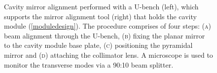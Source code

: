 \documentclass[../Thesis-IJspeert.tex]{subfiles}
\begin{document}
\begin{figure}[t]
\caption[Cavity mirror alignment procedure.]{Cavity mirror alignment performed with a U-bench (left), which supports the mirror alignment tool (right) that holds the cavity module (\autoref{moduledesign}). The procedure comprises of four steps: (\textsc{a}) beam alignment through the U-bench, (\textsc{b}) fixing the planar mirror to the cavity module base plate, (\textsc{c}) positioning the pyramidal mirror and (\textsc{d}) attaching the collimator lens. A microscope is used to monitor the transverse modes via a 90:10 beam splitter.}
\label{alignmentprocedure}
\end{figure}
\end{document}
